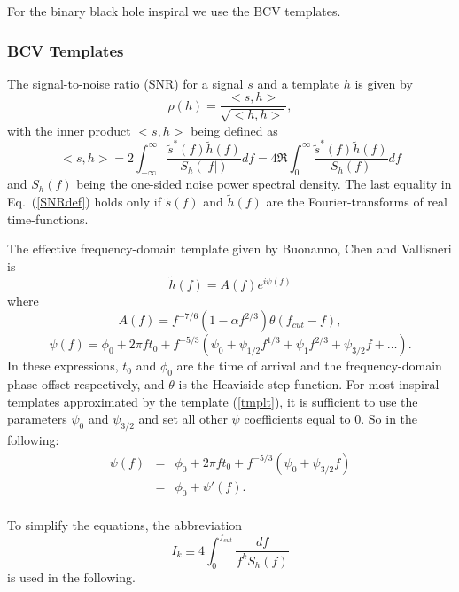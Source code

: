 For the binary black hole inspiral we use the BCV templates.

\subsubsection*{BCV Templates}
\label{BCV}

The signal-to-noise ratio (SNR) for a signal $s$ and a template $h$ is given by
\begin{equation}
\rho(h) = \frac{<s,h>}{\sqrt{<h,h>}},
\end{equation}
with the inner product $<s,h>$ being defined as
\begin{equation}
<s,h> = 2 \int_{-\infty}^{\infty} \frac{\tilde{s}^{\ast}(f) \tilde{h}(f)}
{S_h(|f|)} df =
4 \Re \int_0^{\infty} \frac{\tilde{s}^{\ast}(f) \tilde{h}(f)}{S_h(f)} df
\label{SNRdef}
\end{equation}
and $S_h(f)$ being the one-sided noise power spectral density.
The last equality in Eq.~(\ref{SNRdef}) holds only if $\tilde{s}(f)$ and
$\tilde{h}(f)$ are the Fourier-transforms of real time-functions.

The effective frequency-domain template given by Buonanno, Chen and Vallisneri
is
\begin{equation}
\tilde{h}(f) = A(f) e^{i \psi(f)}
\label{tmplt}
\end{equation}
where
\begin{equation}
A(f) = f^{-7/6} (1-\alpha f^{2/3}) \theta(f_{cut}-f),
\end{equation}
\begin{equation}
\psi(f) = \phi_0 + 2 \pi f t_0 + f^{-5/3} (\psi_0 + \psi_{1/2} f^{1/3} +
\psi_1 f^{2/3} + \psi_{3/2} f + \ldots).
\end{equation}
In these expressions, $t_0$ and $\phi_0$ are the time of arrival and the
frequency-domain phase offset respectively,
and $\theta$ is the Heaviside step function.
For most inspiral templates approximated by the template (\ref{tmplt}),
it is sufficient to use the parameters $\psi_0$ and $\psi_{3/2}$ and set all
other $\psi$ coefficients equal to 0.
So in the following:
\begin{eqnarray}
\psi(f) &=& \phi_0 + 2 \pi f t_0 + f^{-5/3} (\psi_0 + \psi_{3/2} f)\\
        &=& \phi_0 + \psi'(f) . \\
\end{eqnarray}

To simplify the equations, the abbreviation
\begin{equation}
I_k \equiv 4 \int_0^{f_{cut}} \frac{df}{f^k S_h(f)}
\end{equation}
is used in the following.


